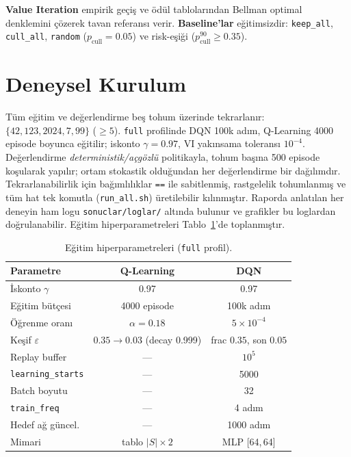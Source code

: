 \documentclass[conference]{IEEEtran}
\begin{document}
\textbf{Value Iteration} empirik geçiş ve ödül tablolarından Bellman optimal denklemini
çözerek tavan referansı verir. \textbf{Baseline'lar} eğitimsizdir: \texttt{keep\_all},
\texttt{cull\_all}, \texttt{random} ($p_{\text{cull}}\!=\!0.05$) ve risk-eşiği
($p^{90}_{\text{cull}}\!\geq\!0.35$).

\section{Deneysel Kurulum}
Tüm eğitim ve değerlendirme beş tohum üzerinde tekrarlanır:
$\{42,123,2024,7,99\}$ ($\geq5$). \texttt{full} profilinde DQN 100k adım, Q-Learning 4000
episode boyunca eğitilir; iskonto $\gamma=0.97$, VI yakınsama toleransı $10^{-4}$.
Değerlendirme \emph{deterministik/açgözlü} politikayla, tohum başına 500 episode
koşularak yapılır; ortam stokastik olduğundan her değerlendirme bir dağılımdır.
Tekrarlanabilirlik için bağımlılıklar \texttt{==} ile sabitlenmiş, rastgelelik tohumlanmış
ve tüm hat tek komutla (\texttt{run\_all.sh}) üretilebilir kılınmıştır. Raporda anlatılan
her deneyin ham logu \texttt{sonuclar/loglar/} altında bulunur ve grafikler bu loglardan
doğrulanabilir. Eğitim hiperparametreleri Tablo~\ref{tab:hyper}'de toplanmıştır.

\begin{table}[t]
\caption{Eğitim hiperparametreleri (\texttt{full} profil).}
\label{tab:hyper}
\centering\footnotesize
\begin{tabular}{@{}l c c@{}}
\toprule
Parametre & Q-Learning & DQN \\
\midrule
İskonto $\gamma$ & 0.97 & 0.97 \\
Eğitim bütçesi & 4000 episode & 100k adım \\
Öğrenme oranı & $\alpha=0.18$ & $5\times10^{-4}$ \\
Keşif $\varepsilon$ & $0.35\!\to\!0.03$ (decay 0.999) & frac $0.35$, son $0.05$ \\
Replay buffer & --- & $10^5$ \\
\texttt{learning\_starts} & --- & 5000 \\
Batch boyutu & --- & 32 \\
\texttt{train\_freq} & --- & 4 adım \\
Hedef ağ güncel. & --- & 1000 adım \\
Mimari & tablo $|S|\!\times\!2$ & MLP [64,\,64] \\
\bottomrule
\end{tabular}
\end{table}
\end{document}
